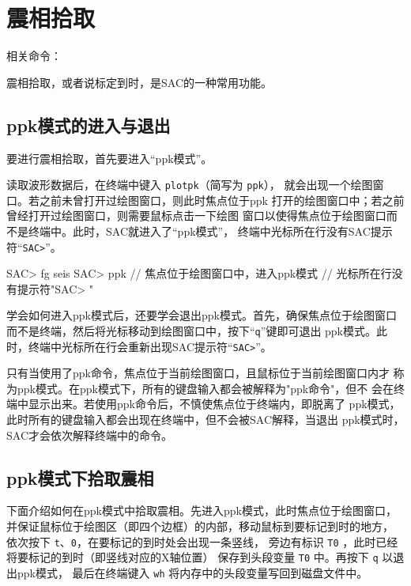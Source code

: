 \section{震相拾取}
\label{sec:phase-picking}
相关命令：

震相拾取，或者说标定到时，是SAC的一种常用功能。

\subsection{ppk模式的进入与退出}
要进行震相拾取，首先要进入``ppk模式''。

读取波形数据后，在终端中键入 \texttt{plotpk}（简写为 \texttt{ppk}），
就会出现一个绘图窗口。若之前未曾打开过绘图窗口，则此时焦点位于ppk
打开的绘图窗口中；若之前曾经打开过绘图窗口，则需要鼠标点击一下绘图
窗口以使得焦点位于绘图窗口而不是终端中。此时，SAC就进入了``ppk模式''，
终端中光标所在行没有SAC提示符``\texttt{SAC>}''。

\begin{SACCode}
SAC> fg seis
SAC> ppk    // 焦点位于绘图窗口中，进入ppk模式
            // 光标所在行没有提示符"SAC> "
\end{SACCode}

学会如何进入ppk模式后，还要学会退出ppk模式。首先，确保焦点位于绘图窗口
而不是终端，然后将光标移动到绘图窗口中，按下``\texttt{q}''键即可退出
ppk模式。此时，终端中光标所在行会重新出现SAC提示符``\texttt{SAC>}''。

\begin{note}
只有当使用了ppk命令，焦点位于当前绘图窗口，且鼠标位于当前绘图窗口内才
称为ppk模式。在ppk模式下，所有的键盘输入都会被解释为"ppk命令"，但不
会在终端中显示出来。若使用ppk命令后，不慎使焦点位于终端内，即脱离了
ppk模式，此时所有的键盘输入都会出现在终端中，但不会被SAC解释，当退出
ppk模式时，SAC才会依次解释终端中的命令。
\end{note}

\subsection{ppk模式下拾取震相}
下面介绍如何在ppk模式中拾取震相。先进入ppk模式，此时焦点位于绘图窗口，
并保证鼠标位于绘图区（即四个边框）的内部，移动鼠标到要标记到时的地方，
依次按下 \texttt{t}、\texttt{0}，在要标记的到时处会出现一条竖线，
旁边有标识 \texttt{T0} ，此时已经将要标记的到时（即竖线对应的X轴位置）
保存到头段变量 \texttt{T0} 中。再按下 \texttt{q} 以退出ppk模式，
最后在终端键入 \texttt{wh} 将内存中的头段变量写回到磁盘文件中。

